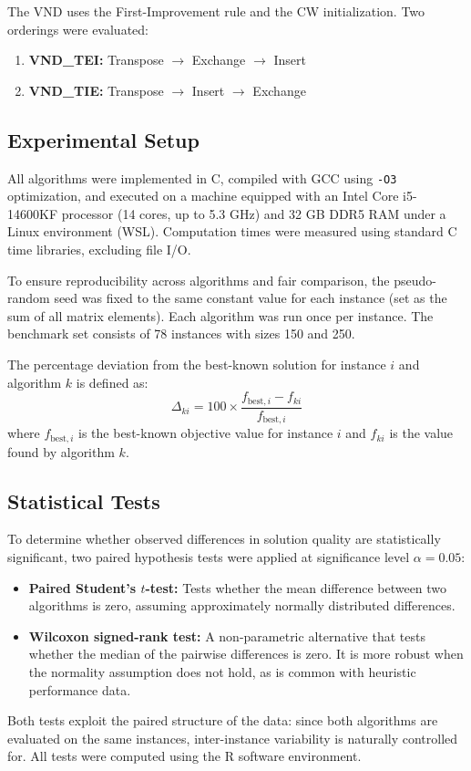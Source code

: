 \documentclass[11pt, a4paper]{article}
\begin{document}
The VND uses the First-Improvement rule and the CW initialization. Two orderings were evaluated:
\begin{enumerate}
    \item \textbf{VND\_TEI:} Transpose $\rightarrow$ Exchange $\rightarrow$ Insert
    \item \textbf{VND\_TIE:} Transpose $\rightarrow$ Insert $\rightarrow$ Exchange
\end{enumerate}

\subsection{Experimental Setup}

All algorithms were implemented in C, compiled with GCC using \texttt{-O3} optimization, and executed on a machine equipped with an Intel Core i5-14600KF processor (14 cores, up to 5.3 GHz) and 32 GB DDR5 RAM under a Linux environment (WSL). Computation times were measured using standard C time libraries, excluding file I/O.

To ensure reproducibility across algorithms and fair comparison, the pseudo-random seed was fixed to the same constant value for each instance (set as the sum of all matrix elements). Each algorithm was run once per instance. The benchmark set consists of 78 instances with sizes 150 and 250.

The percentage deviation from the best-known solution for instance $i$ and algorithm $k$ is defined as:
\begin{equation}
    \Delta_{ki} = 100 \times \frac{f_{\text{best},i} - f_{ki}}{f_{\text{best},i}}
\end{equation}
where $f_{\text{best},i}$ is the best-known objective value for instance $i$ and $f_{ki}$ is the value found by algorithm $k$.

\subsection{Statistical Tests}

To determine whether observed differences in solution quality are statistically significant, two paired hypothesis tests were applied at significance level $\alpha = 0.05$:
\begin{itemize}
    \item \textbf{Paired Student's $t$-test:} Tests whether the mean difference between two algorithms is zero, assuming approximately normally distributed differences.
    \item \textbf{Wilcoxon signed-rank test:} A non-parametric alternative that tests whether the median of the pairwise differences is zero. It is more robust when the normality assumption does not hold, as is common with heuristic performance data.
\end{itemize}
Both tests exploit the paired structure of the data: since both algorithms are evaluated on the same instances, inter-instance variability is naturally controlled for. All tests were computed using the R software environment.
\end{document}
